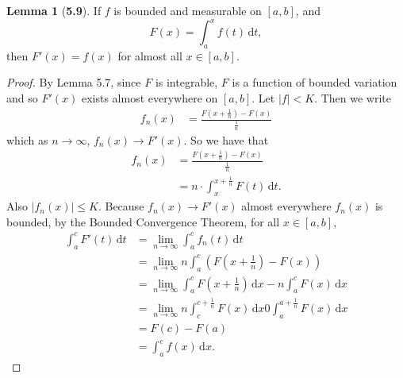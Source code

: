 \documentclass[12pt]{article}
\newcommand{\dif}{\, \mathrm{d}}
\theoremstyle{definition}
\newtheorem*{lemma}{Lemma}
\begin{document}
\begin{lemma}[\textbf{5.9}]

    If \( f \) is bounded and measurable on \( [a,b] \), and 
        \[
            F(x) = \int_{a}^{x} f(t) \dif t,
        \]  
    then \( F'(x) = f(x) \) for almost all \( x \in [a,b ] \).

    \begin{proof}
        By Lemma 5.7, since \( F \) is integrable, \( F \) is a function of bounded variation and so \( F'(x) \) exists almost everywhere on \( [a,b] \). Let \( |f| < K \). Then we write
            \begin{align*}
                f_n(x) &= \frac{F\left( x + \frac{1}{n}\right) - F(x)}{\frac{1}{n}} 
            \end{align*}
        which as \( n \to \infty \), \( f_n(x) \to F'(x) \). So we have that 
            \begin{align*}
                f_n(x) &= \frac{F\left( x + \frac{1}{n}\right) - F(x)}{\frac{1}{n}} \\
                &= n \cdot \int_{x}^{x+ \frac{1}{n}} F(t) \dif t.
            \end{align*}
        Also \( |f_n(x)| \leq K \). Because \( f_n(x) \to F'(x) \) almost everywhere \( f_n(x) \) is bounded, by the Bounded Convergence Theorem, for all \( x \in [a,b] \), 
            \begin{align*}
                \int_{a}^{c} F'(t) \dif t &= \lim_{n \to \infty} \int_{a}^{c} f_n(t) \dif t \\
                &= \lim_{n \to \infty} n \int_{a}^{c} \left( F \left( x + \frac{1}{n}\right) - F(x) \right) \\
                &= \lim_{n \to \infty} \int_{a}^{c} F \left( x + \frac{1}{n} \right) \dif x - n \int_{a}^{c} F(x) \dif x \\
                &= \lim_{n \to \infty } n \int_{c}^{c + \frac{1}{n}} F(x) \dif x 0 \int_{a}^{a + \frac{1}{n}} F(x) \dif x \\
                &= F(c) - F(a) \\
                &= \int_{a}^{c} f(x) \dif x. 
            \end{align*}
    \end{proof}
    
\end{lemma}
\end{document}
